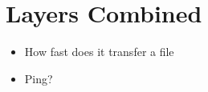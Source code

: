 \section{Layers Combined}

\begin{itemize}
\item How fast does it transfer a file
\item Ping?
\end{itemize}
